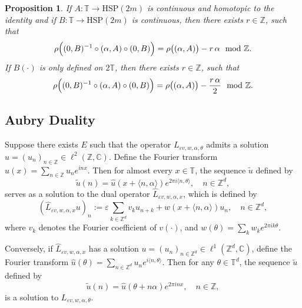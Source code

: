 \documentclass[11pt]{amsart}
\newtheorem{proposition}[theorem]{Proposition}
\theoremstyle{remark}
\theoremstyle{definition}
\newcommand{\T}{{\mathbf T}}
\newcommand{\Z}{{\mathbf Z}}
\def \Z{\mathcal{Z}}
\def\Z{{\mathbb Z}}
\def\T{{\mathbb T}}
\begin{document}
\begin{proposition}\label{rho}\cite{LW}
	If \(A:\T\to \mathrm{HSP}(2m)\) is continuous and homotopic to the identity and if \(B:\T\to \mathrm{HSP}(2m)\) is continuous, then there exists $r\in\Z$, such that
	\[
	\rho\Bigl((0,B)^{-1}\circ (\alpha,A)\circ (0,B)\Bigr)=\rho\bigl((\alpha,A)\bigr)- r\,\alpha \mod \Z.
	\]If \(B(\cdot)\) is only defined on \(2\T\), then there exists  \(r\in \Z\), such that 
	\[
	\rho\Bigl((0,B)^{-1}\circ (\alpha,A)\circ (0,B)\Bigr)=\rho\bigl((\alpha,A)\bigr)-\frac{r\,\alpha}{2} \mod \Z.
	\]
\end{proposition}
     

\subsection{Aubry Duality}
Suppose there exists \( E \) such that the operator \( L_{\varepsilon v,w,\alpha,\theta} \) admits a solution \( u = (u_n)_{n \in \mathbb{Z}} \in \ell^2(\mathbb{Z}, \mathbb{C}) \). Define the Fourier transform \( \hat{u}(x) = \sum_{n \in \mathbb{Z}} u_n e^{inx} \). Then for almost every \( x \in \mathbb{T} \), the sequence \( \tilde{u} \) defined by
\[
\tilde{u}(n) = \hat{u}\left(x + \langle n, \alpha \rangle\right) e^{2\pi i \langle n, \theta \rangle}, \quad n \in \mathbb{Z}^d,
\]
serves as a solution to the dual operator \( \widehat{L}_{\varepsilon v,w,\alpha,x} \), which is defined by
\begin{equation}\label{dualo}
\left( \widehat{L}_{\varepsilon v,w,\alpha,x} u \right)_n := \varepsilon \sum_{k \in \mathbb{Z}^d} v_k u_{n+k} + w\left(x + \langle n, \alpha \rangle\right) u_n, \quad n \in \mathbb{Z}^d,
\end{equation}
where \( v_k \) denotes the Fourier coefficient of \( v(\cdot) \), and \( w(\theta) = \sum_{k} w_k e^{2\pi i k \theta} \).

Conversely, if \( \widehat{L}_{\varepsilon v,w,\alpha,x} \) has a solution \( u = (u_n)_{n \in \mathbb{Z}^d} \in \ell^1(\mathbb{Z}^d, \mathbb{C}) \), define the Fourier transform \( \hat{u}(\theta) = \sum_{n \in \mathbb{Z}^d} u_n e^{i\langle n, \theta \rangle} \). Then for any \( \theta \in \mathbb{T}^d \), the sequence \( \tilde{u} \) defined by
\[
\tilde{u}(n) = \hat{u}\left(\theta + n\alpha\right) e^{2\pi i n x}, \quad n \in \mathbb{Z},
\]
is a solution to \( L_{\varepsilon v,w,\alpha,\theta} \).
\end{document}
